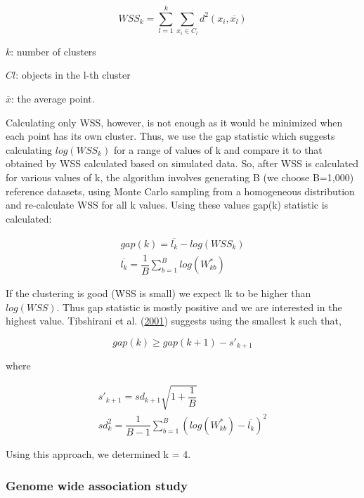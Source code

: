 \documentclass[12pt,twoside]{unicam}
\begin{document}
\begin{equation}
    WSS_k = \sum_{l=1}^{k}{\sum_{x_i\in C_l}{d^2(x_i,\overline{x_l})}}
  \label{eq:disWSS}
\end{equation}

\(k\): number of clusters

\(Cl\): objects in the l-th cluster

\(\overline{x}\): the average point.

Calculating only WSS, however, is not enough as it would be minimized when each point has its own cluster. Thus, we use the gap statistic which suggests calculating \(log(WSS_k)\) for a range of values of k and compare it to that obtained by WSS calculated based on simulated data. So, after WSS is calculated for various values of k, the algorithm involves generating B (we choose B=1,000) reference datasets, using Monte Carlo sampling from a homogeneous distribution and re-calculate WSS for all k values. Using these values gap(k) statistic is calculated:

\begin{equation}
\begin{aligned}
    gap(k) = \overline{l_k}-log(WSS_k)\\\overline{l_k} =\dfrac{1}{B}\sum_{b=1}^{B}{log(W^*_{kb})}
  \label{eq:disgapstat}
\end{aligned}
\end{equation}

If the clustering is good (WSS is small) we expect lk to be higher than \(log(WSS)\). Thus gap statistic is mostly positive and we are interested in the highest value. Tibshirani et al. (\protect\hyperlink{ref-Tibshirani2001}{2001}) suggests using the smallest k such that,

\begin{equation}
    gap(k)≥gap(k+1)-s'_{k+1}
  \label{eq:disgapstatincrem}
\end{equation}

where

\begin{equation}
\begin{aligned}
    s'_{k+1}=sd_{k+1}\sqrt{1+\dfrac{1}{B}}\\
    sd^2_k=\dfrac{1}{B-1}\sum_{b=1}^{B}{(log(W^*_{kb})-\overline{l_k})^2}
  \label{eq:dissk}
\end{aligned}
\end{equation}

Using this approach, we determined k = 4.

\hypertarget{genome-wide-association-study}{%
\subsubsection{Genome wide association study}\label{genome-wide-association-study}}
\end{document}
